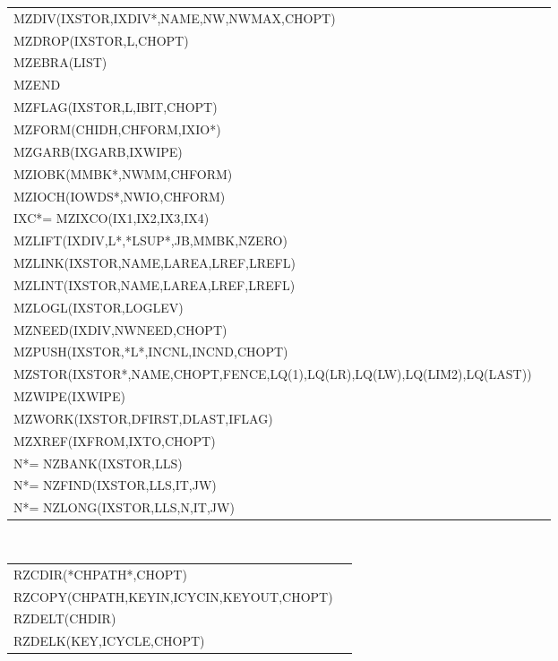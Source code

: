 {\begin{tabular*}{\textwidth}{l@{\extracolsep{\fill}}r}
MZDIV(IXSTOR,IXDIV*,NAME,NW,NWMAX,CHOPT)&\pageref{SR_MZDIV}\\
MZDROP(IXSTOR,L,CHOPT)&\pageref{SR_MZDROP}\\
MZEBRA(LIST)&\pageref{SR_MZEBRA}\\
MZEND&\pageref{SR_MZEND}\\
MZFLAG(IXSTOR,L,IBIT,CHOPT)&\pageref{SR_MZFLAG}\\
MZFORM(CHIDH,CHFORM,IXIO*)&\pageref{SR_MZFORM}\\
MZGARB(IXGARB,IXWIPE)&\pageref{SR_MZGARB}\\
MZIOBK(MMBK*,NWMM,CHFORM)&\pageref{SR_MZIOBK}\\
MZIOCH(IOWDS*,NWIO,CHFORM)&\pageref{SR_MZIOCH}\\
IXC*= MZIXCO(IX1,IX2,IX3,IX4)&\pageref{SR_MZIXCO}\\
MZLIFT(IXDIV,L*,*LSUP*,JB,MMBK,NZERO)&\pageref{SR_MZLIFT}\\
MZLINK(IXSTOR,NAME,LAREA,LREF,LREFL)&\pageref{SR_MZLINK}\\
MZLINT(IXSTOR,NAME,LAREA,LREF,LREFL)&\pageref{SR_MZLINT}\\
MZLOGL(IXSTOR,LOGLEV)&\pageref{SR_MZLOGL}\\
MZNEED(IXDIV,NWNEED,CHOPT)&\pageref{SR_MZNEED}\\
MZPUSH(IXSTOR,*L*,INCNL,INCND,CHOPT)&\pageref{SR_MZPUSH}\\
MZSTOR(IXSTOR*,NAME,CHOPT,FENCE,LQ(1),LQ(LR),LQ(LW),LQ(LIM2),LQ(LAST))&\pageref{SR_MZSTOR}\\
MZWIPE(IXWIPE)&\pageref{SR_MZWIPE}\\
MZWORK(IXSTOR,DFIRST,DLAST,IFLAG)&\pageref{SR_MZWORK}\\
MZXREF(IXFROM,IXTO,CHOPT)&\pageref{SR_MZXREF}\\
N*= NZBANK(IXSTOR,LLS)&\pageref{SR_NZBANK}\\
N*= NZFIND(IXSTOR,LLS,IT,JW)&\pageref{SR_NZFIND}\\
N*= NZLONG(IXSTOR,LLS,N,IT,JW)&\pageref{SR_NZLONG}\\
\end{tabular*}\\
\newpage
\begin{tabular*}{\textwidth}{l@{\extracolsep{\fill}}r}
RZCDIR(*CHPATH*,CHOPT)&\pageref{SR_RZCDIR}\\
RZCOPY(CHPATH,KEYIN,ICYCIN,KEYOUT,CHOPT)&\pageref{SR_RZCOPY}\\
RZDELT(CHDIR)&\pageref{SR_RZDELT}\\
RZDELK(KEY,ICYCLE,CHOPT)&\pageref{SR_RZDELK}\\

\end{tabular*}}
